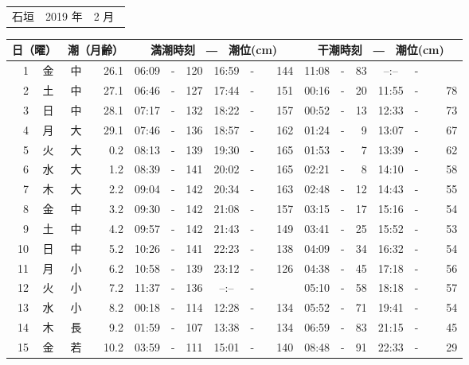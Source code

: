 \documentclass[12pt,a4j]{jsarticle}
\begin{document}
 \begin{table}[htbp]
 \begin{tabular}{lcc}
 {\LARGE 石垣 } & {\large 2019 年} & {\large  2 月}\
 \end{tabular}
 \begin{center}
    \begin{tabular}{|rc|cr|ccrccr|ccrccr|}
    \hline
    \multicolumn{2}{|c|}{日（曜）} & \multicolumn{2}{c|}{潮（月齢）} & \multicolumn{6}{c|}{満潮時刻　―　潮位(cm)} & \multicolumn{6}{c|}{干潮時刻　―　潮位(cm)} \\
 \hline
 1 & 金 & 中 & 26.1 &  06:09 &-& 120  &  16:59 &-& 144  &   11:08 &-&  83  &   --:-- &-&~~~~~ \\
 2 & 土 & 中 & 27.1 &  06:46 &-& 127  &  17:44 &-& 151  &   00:16 &-&  20  &   11:55 &-&  78  \\
 3 & 日 & 中 & 28.1 &  07:17 &-& 132  &  18:22 &-& 157  &   00:52 &-&  13  &   12:33 &-&  73  \\
 4 & 月 & 大 & 29.1 &  07:46 &-& 136  &  18:57 &-& 162  &   01:24 &-&   9  &   13:07 &-&  67  \\
 5 & 火 & 大 &  0.2 &  08:13 &-& 139  &  19:30 &-& 165  &   01:53 &-&   7  &   13:39 &-&  62  \\
 6 & 水 & 大 &  1.2 &  08:39 &-& 141  &  20:02 &-& 165  &   02:21 &-&   8  &   14:10 &-&  58  \\
 7 & 木 & 大 &  2.2 &  09:04 &-& 142  &  20:34 &-& 163  &   02:48 &-&  12  &   14:43 &-&  55  \\
 8 & 金 & 中 &  3.2 &  09:30 &-& 142  &  21:08 &-& 157  &   03:15 &-&  17  &   15:16 &-&  54  \\
 9 & 土 & 中 &  4.2 &  09:57 &-& 142  &  21:43 &-& 149  &   03:41 &-&  25  &   15:52 &-&  53  \\
10 & 日 & 中 &  5.2 &  10:26 &-& 141  &  22:23 &-& 138  &   04:09 &-&  34  &   16:32 &-&  54  \\
11 & 月 & 小 &  6.2 &  10:58 &-& 139  &  23:12 &-& 126  &   04:38 &-&  45  &   17:18 &-&  56  \\
12 & 火 & 小 &  7.2 &  11:37 &-& 136  &  --:-- &-&~~~~~ &   05:10 &-&  58  &   18:18 &-&  57  \\
13 & 水 & 小 &  8.2 &  00:18 &-& 114  &  12:28 &-& 134  &   05:52 &-&  71  &   19:41 &-&  54  \\
14 & 木 & 長 &  9.2 &  01:59 &-& 107  &  13:38 &-& 134  &   06:59 &-&  83  &   21:15 &-&  45  \\
15 & 金 & 若 & 10.2 &  03:59 &-& 111  &  15:01 &-& 140  &   08:48 &-&  91  &   22:33 &-&  29  \\

\end{tabular}
\end{center}
\end{table}
\end{document}
